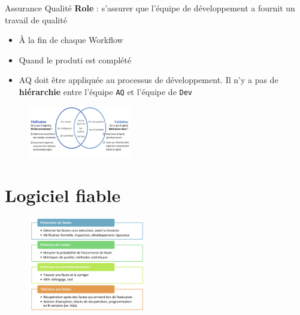 \documentclass[16pt]{report}
\begin{document}
\begin{multicols*}{2}
        \begin{Concept}{Assurance Qualité}{}
           \textbf{Role} : s'assurer que l'équipe de développement a fournit un \textcolor{myb}{travail de qualité}   
           \begin{itemize}
            \item À la fin de chaque Workflow 
            \item Quand le produti est complété 
            \item AQ doit être appliquée au processus de développement. 
            Il n'y a pas de \textbf{hiérarchie} entre l'équipe \texttt{AQ} et l'équipe de \texttt{Dev}      
           \end{itemize}
        \end{Concept}


        \begin{figure}[H]
            \begin{center}
                \includegraphics[width=0.40\textwidth]{VerifValid.png}
            \end{center}
        \end{figure}


        \section{Logiciel fiable}


        \begin{figure}[H]
        \begin{center}
            \includegraphics[width=0.45\textwidth]{LogiFiable}
        \end{center}
       \end{figure}


\end{multicols*}
\end{document}
